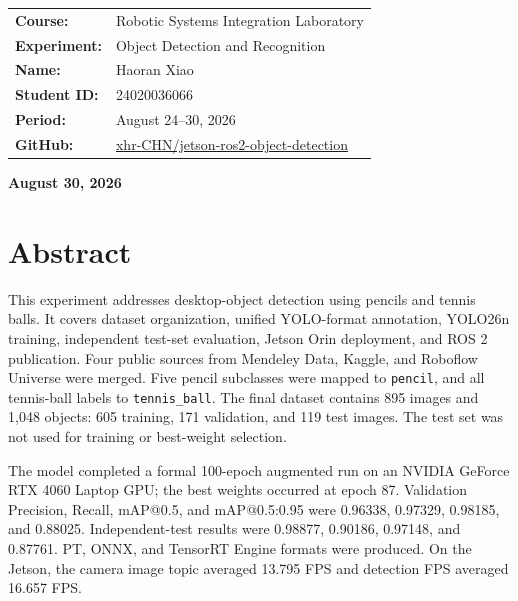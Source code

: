 \documentclass[UTF8,zihao=-4,scheme=chinese,fontset=none]{ctexart}
\begin{document}
\begin{titlepage}\thispagestyle{empty}\begin{center}
\vspace{2.4cm}\renewcommand{\arraystretch}{1.8}
\begin{tabular}{>{\bfseries}p{3.2cm}p{8.2cm}}
Course: & Robotic Systems Integration Laboratory\\ Experiment: & Object Detection and Recognition\\ Name: & Haoran Xiao\\ Student ID: & 24020036066\\ Period: & August 24--30, 2026\\ GitHub: & \href{https://github.com/xhr-CHN/jetson-ros2-object-detection}{xhr-CHN/jetson-ros2-object-detection}\\
\end{tabular}\vfill{\bfseries{}August 30, 2026\par}\end{center}\end{titlepage}
\setcounter{page}{1}
\section*{Abstract}
This experiment addresses desktop-object detection using pencils and tennis balls. It covers dataset organization, unified YOLO-format annotation, YOLO26n training, independent test-set evaluation, Jetson Orin deployment, and ROS 2 publication. Four public sources from Mendeley Data, Kaggle, and Roboflow Universe were merged. Five pencil subclasses were mapped to \texttt{pencil}, and all tennis-ball labels to \texttt{tennis\_ball}. The final dataset contains 895 images and 1,048 objects: 605 training, 171 validation, and 119 test images. The test set was not used for training or best-weight selection.

The model completed a formal 100-epoch augmented run on an NVIDIA GeForce RTX 4060 Laptop GPU; the best weights occurred at epoch 87. Validation Precision, Recall, mAP@0.5, and mAP@0.5:0.95 were 0.96338, 0.97329, 0.98185, and 0.88025. Independent-test results were 0.98877, 0.90186, 0.97148, and 0.87761. PT, ONNX, and TensorRT Engine formats were produced. On the Jetson, the camera image topic averaged 13.795 FPS and detection FPS averaged 16.657 FPS.
\end{document}
